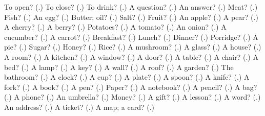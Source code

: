 \begin{tcolorbox}[breakable,colback=teal!4,colframe=teal!35!black,title={Before you move on}]
To open? (\textbf{}.) To close? (\textbf{}.) To drink? (\textbf{}.) A question? (\textbf{}.) An answer? (\textbf{}.) Meat? (\textbf{}.) Fish? (\textbf{}.) An egg? (\textbf{}.) Butter; oil? (\textbf{}.) Salt? (\textbf{}.) Fruit? (\textbf{}.) An apple? (\textbf{}.) A pear? (\textbf{}.) A cherry? (\textbf{}.) A berry? (\textbf{}.) Potatoes? (\textbf{}.) A tomato? (\textbf{}.) An onion? (\textbf{}.) A cucumber? (\textbf{}.) A carrot? (\textbf{}.) Breakfast? (\textbf{}.) Lunch? (\textbf{}.) Dinner? (\textbf{}.) Porridge? (\textbf{}.) A pie? (\textbf{}.) Sugar? (\textbf{}.) Honey? (\textbf{}.) Rice? (\textbf{}.) A mushroom? (\textbf{}.) A glass? (\textbf{}.) A house? (\textbf{}.) A room? (\textbf{}.) A kitchen? (\textbf{}.) A window? (\textbf{}.) A door? (\textbf{}.) A table? (\textbf{}.) A chair? (\textbf{}.) A bed? (\textbf{}.) A lamp? (\textbf{}.) A key? (\textbf{}.) A wall? (\textbf{}.) A roof? (\textbf{}.) A garden? (\textbf{}.) The bathroom? (\textbf{}.) A clock? (\textbf{}.) A cup? (\textbf{}.) A plate? (\textbf{}.) A spoon? (\textbf{}.) A knife? (\textbf{}.) A fork? (\textbf{}.) A book? (\textbf{}.) A pen? (\textbf{}.) Paper? (\textbf{}.) A notebook? (\textbf{}.) A pencil? (\textbf{}.) A bag? (\textbf{}.) A phone? (\textbf{}.) An umbrella? (\textbf{}.) Money? (\textbf{}.) A gift? (\textbf{}.) A lesson? (\textbf{}.) A word? (\textbf{}.) An address? (\textbf{}.) A ticket? (\textbf{}.) A map; a card? (\textbf{}.)
\end{tcolorbox}
